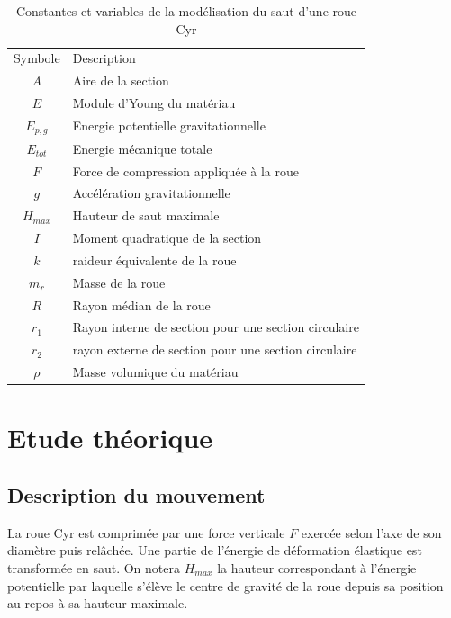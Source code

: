 \label{sec:Theme1}
\begin{table}[htbp]
  \centering
  \caption{Constantes et variables de la modélisation du saut d'une roue Cyr}
  \begin{tabular}{|c|l|}
    \hline \rowcolor[gray]{0.8}\color{black}
    Symbole         & Description\\
    $A$           & Aire de la section\\
   
    $E$           & Module d'Young du matériau\\
    $E_{p,g}$          & Energie potentielle gravitationnelle\\
    $E_{tot}$          & Energie mécanique totale\\
    $F$             & Force de compression appliquée à la roue\\
    $g$     & Accélération gravitationnelle\\
    $H_{max}$          & Hauteur de saut maximale\\
    $I$           & Moment quadratique de la section\\
    $k$             & raideur équivalente de la roue\\
    $m_r$          & Masse de la roue\\
    
    $R$       & Rayon médian de la roue\\
    $r_1$ & Rayon interne de section pour une section circulaire\\
    $r_2$             & rayon externe de section pour une section circulaire\\
    $\rho$           & Masse volumique du matériau\\ \hline
  \end{tabular}
  \label{tab:Definitions}
\end{table}


\section{Etude théorique}
\subsection{Description du mouvement}
La roue Cyr est comprimée par une force verticale $F$ exercée selon l'axe de son diamètre puis relâchée. Une partie de l'énergie de déformation élastique est transformée en saut. On notera $H_{max}$ la hauteur correspondant à l'énergie potentielle par laquelle s'élève le centre de gravité de la roue depuis sa position au repos à sa hauteur maximale.


